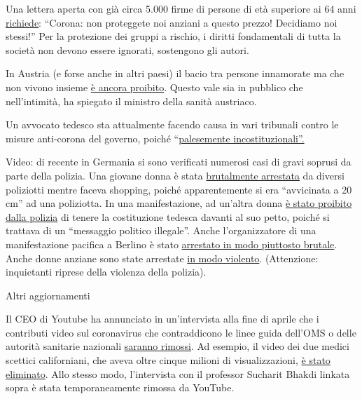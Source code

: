 Una lettera aperta con già circa 5.000 firme di persone di età superiore
ai 64 anni
\href{https://www.change.org/p/bundeskanzlerin-corona-sch\%C3\%BCtzen-sie-\%C3\%A4ltere-nicht-um-diesen-preis-selbstbestimmt-altern-und-sterben}{richiede}:
``Corona: non proteggete noi anziani a questo prezzo! Decidiamo noi
stessi!'' Per la protezione dei gruppi a rischio, i diritti fondamentali
di tutta la società non devono essere ignorati, sostengono gli autori.

In Austria (e forse anche in altri paesi) il bacio tra persone
innamorate ma che non vivono insieme
\href{https://www.unsertirol24.com/2020/04/29/oeffentliches-kuessen-wird-unter-strafe-gestellt/}{è
ancora proibito}. Questo vale sia in pubblico che nell'intimità, ha
spiegato il ministro della sanità austriaco.

Un avvocato tedesco sta attualmente facendo causa in vari tribunali
contro le misure anti-corona del governo, poiché
``\href{https://www.rubikon.news/artikel/eklatant-verfassungswidrig-2}{palesemente
incostituzionali''.}

Video: di recente in Germania si sono verificati numerosi casi di gravi
soprusi da parte della polizia. Una giovane donna è stata
\href{https://www.youtube.com/watch?v=TZrKv4-jkK8}{brutalmente
arrestata} da diversi poliziotti mentre faceva shopping, poiché
apparentemente si era ``avvicinata a 20 cm'' ad una poliziotta. In una
manifestazione, ad un'altra donna
\href{https://twitter.com/ChristianFritze/status/1256609660318224385}{è
stato proibito dalla polizia} di tenere la costituzione tedesca davanti
al suo petto, poiché si trattava di un ``messaggio politico illegale''.
Anche l'organizzatore di una manifestazione pacifica a Berlino è stato
\href{https://www.youtube.com/watch?v=NbV2OH3uYxI}{arrestato in modo
piuttosto brutale}. Anche donne anziane sono state arrestate
\href{https://www.youtube.com/watch?v=Bn11jXTjh_Y}{in modo violento}.
(Attenzione: inquietanti riprese della violenza della polizia).

Altri aggiornamenti

Il CEO di Youtube ha annunciato in un'intervista alla fine di aprile che
i contributi video sul coronavirus che contraddicono le linee guida
dell'OMS o delle autorità sanitarie nazionali
\href{https://www.businessinsider.com/youtube-will-ban-anything-against-who-guidance-2020-4}{saranno
rimossi}. Ad esempio, il video dei due medici scettici californiani, che
aveva oltre cinque milioni di visualizzazioni,
\href{https://www.turnto23.com/news/coronavirus/video-interview-with-dr-dan-erickson-and-dr-artin-massihi-taken-down-from-youtube}{è
stato eliminato}. Allo stesso modo, l'intervista con il professor
Sucharit Bhakdi linkata sopra è stata temporaneamente rimossa da
YouTube.


